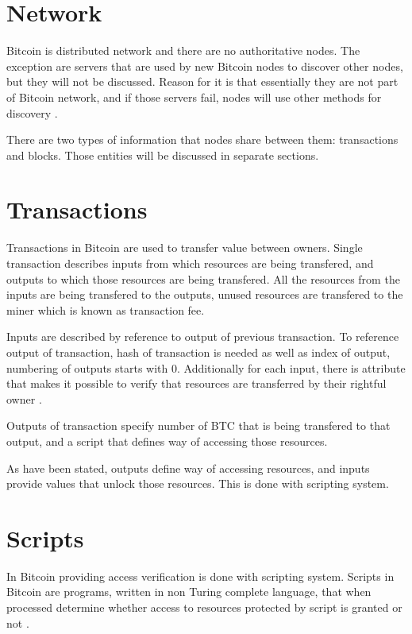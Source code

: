 \documentclass[12pt, en, eng, oneside, final]{mgr}
\begin{document}
\section{Network}
Bitcoin is distributed network and there are no authoritative nodes. The exception are servers that are used by new Bitcoin nodes to discover other nodes, but they will not be discussed. Reason for it is that essentially they are not part of Bitcoin network, and if those servers fail, nodes will use other methods for discovery \cite{bitcoin-paper-1}.

There are two types of information that nodes share between them: transactions and blocks\cite{bitcoin-paper-1}. Those entities will be discussed in separate sections.

\section{Transactions}
Transactions in Bitcoin are used to transfer value between owners. Single transaction describes inputs from which resources are being transfered, and outputs to which those resources are being transfered. All the resources from the inputs are being transfered to the outputs, unused resources are transfered to the miner which is known as transaction fee.

Inputs are described by reference to output of previous transaction. To reference output of transaction, hash of transaction is needed as well as index of output, numbering of outputs starts with 0. Additionally for each input, there is attribute that makes it possible to verify that resources are transferred by their rightful owner \cite{bitcoin-transaction}.

Outputs of transaction specify number of BTC that is being transfered to that output, and a script that defines way of accessing those resources. 

As have been stated, outputs define way of accessing resources, and inputs provide values that unlock those resources. This is done with scripting system.

\section{Scripts}
In Bitcoin providing access verification is done with scripting system. Scripts in Bitcoin are programs, written in non Turing complete language, that when processed determine whether access to resources protected by script is granted or not \cite{bitcoin-script}.
\end{document}
